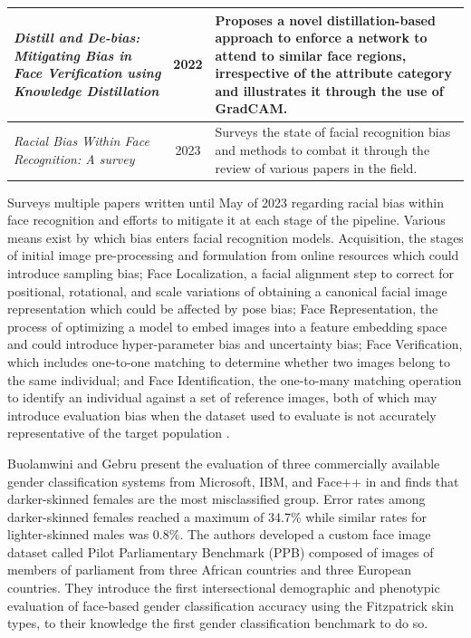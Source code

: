 \documentclass[conference]{IEEEtran}
\begin{document}
\begin{table}[!ht]
\begin{tabular}{|p{7cm}|c|p{9cm}|}
\hline
\textit{Distill and De-bias: Mitigating Bias in Face Verification using Knowledge Distillation}\cite{dhar2022distill} & 2022 & Proposes a novel distillation-based approach to enforce a network to attend to similar face regions, irrespective of the attribute category and illustrates it through the use of GradCAM. \\
\hline
\textit{Racial Bias Within Face Recognition: A survey} \cite{yucer2023racial} & 2023 & Surveys the state of facial recognition bias and methods to combat it through the review of various papers in the field. \\
\hline
\end{tabular}
\label{tab1}
\end{table}

\cite{yucer2023racial} Surveys multiple papers written until May of 2023 regarding racial bias within face recognition and efforts to mitigate it at each stage of the pipeline. Various means exist by which bias enters facial recognition models. Acquisition, the stages of initial image pre-processing and formulation from online resources which could introduce sampling bias; Face Localization, a facial alignment step to correct for positional, rotational, and scale variations of obtaining a canonical facial image representation which could be affected by pose bias; Face Representation, the process of optimizing a model to embed images into a feature embedding space and could introduce hyper-parameter bias and uncertainty bias; Face Verification, which includes one-to-one matching to determine whether two images belong to the same individual; and Face Identification, the one-to-many matching operation to identify an individual against  a set of reference images, both of which may introduce evaluation bias when the dataset used to evaluate is not accurately representative of the target population \cite{suresh2021framework}.

Buolamwini and Gebru present the evaluation of three commercially available gender classification systems from Microsoft, IBM, and Face++ in\cite{pmlr-v81-buolamwini18a} and finds that darker-skinned females are the most misclassified group. Error rates among darker-skinned females reached a maximum of 34.7\% while similar rates for lighter-skinned males was 0.8\%. The authors developed a custom face image dataset called Pilot Parliamentary Benchmark (PPB) composed of images of members of parliament from three African countries and three European countries. They introduce the first intersectional demographic and phenotypic evaluation of face-based gender classification accuracy using the Fitzpatrick skin types\cite{fitzpatrick1988validity}, to their knowledge the first gender classification benchmark to do so. 
\end{document}
